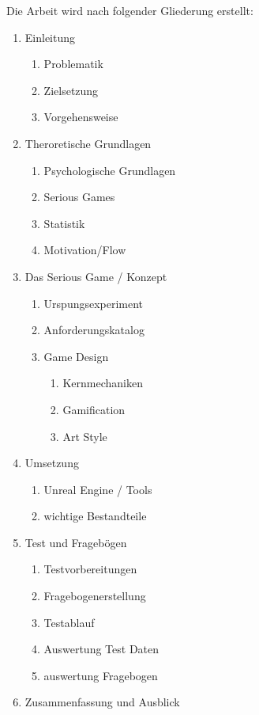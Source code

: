 Die Arbeit wird nach folgender Gliederung erstellt: 
\begin{enumerate}
\item Einleitung
	\begin{enumerate}[label*=\arabic*.]	
	\item Problematik
	\item Zielsetzung
	\item Vorgehensweise
	\end{enumerate}
\item Theroretische Grundlagen
	\begin{enumerate}[label*=\arabic*.]	
	\item Psychologische Grundlagen
	\item Serious Games
	\item Statistik
	\item Motivation/Flow
	\end{enumerate}
\item Das Serious Game / Konzept
	\begin{enumerate}[label*=\arabic*.]	
	\item Urspungsexperiment
	\item Anforderungskatalog
	\item Game Design
		\begin{enumerate}[label*=\arabic*.]
		\item Kernmechaniken
		\item Gamification
		\item Art Style
		\end{enumerate}
	\end{enumerate}
\item Umsetzung
	\begin{enumerate}[label*=\arabic*.]	
	\item Unreal Engine / Tools
	\item wichtige Bestandteile
	\end{enumerate}
\item Test und Fragebögen
	\begin{enumerate}[label*=\arabic*.]	
	\item Testvorbereitungen
	\item Fragebogenerstellung
	\item Testablauf
	\item Auswertung Test Daten
	\item auswertung Fragebogen
	\end{enumerate}
\item Zusammenfassung und Ausblick
\end{enumerate}